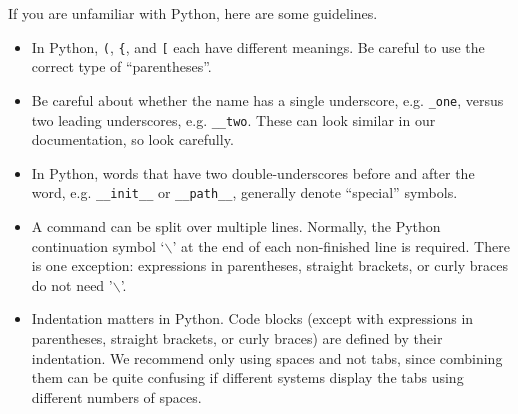 If you are unfamiliar with Python, here are some guidelines.

\begin{itemize}
  \item In Python, \pythonindex \verb|(|, \verb|{|, and \verb|[| each have different
  meanings.  Be careful to use the correct type of ``parentheses''.
  \item Be careful about whether the name has a single underscore, e.g.
  \verb|_one|, versus two leading underscores, e.g. \verb|__two|.  These can
  look similar in our documentation, so look carefully.
  \item In Python, \pythonindex words that have two double-underscores before and after the
  word, e.g. \verb|__init__| or \verb|__path__|, generally denote ``special''
  symbols.
  \item A command can be split over multiple lines. Normally, the Python continuation symbol `$\backslash$'
  at the end of each non-finished line is required. There is one exception:
  expressions in parentheses, straight brackets, or curly braces do not need '$\backslash$'.
  \item Indentation matters in Python. Code blocks (except with expressions
    in parentheses, straight brackets, or curly braces) are defined by
    their indentation.  We recommend only using spaces and not tabs, since
    combining them can be quite confusing if different systems display the
    tabs using different numbers of spaces.
\end{itemize}


